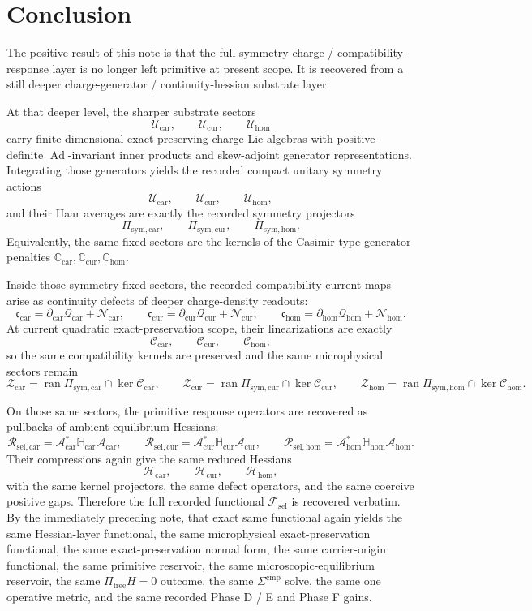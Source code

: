 \documentclass[11pt]{article}
\newcommand{\StemFunctional}{\mathscr F_{\mathrm{sel}}}
\newcommand{\UltraTensorClass}{\mathscr Z_{\mathrm{car}}}
\newcommand{\UltraRelabelClass}{\mathscr Z_{\mathrm{cur}}}
\newcommand{\UltraFreeClass}{\mathscr Z_{\mathrm{hom}}}
\newcommand{\RootTensorClass}{\mathscr U_{\mathrm{car}}}
\newcommand{\RootRelabelClass}{\mathscr U_{\mathrm{cur}}}
\newcommand{\RootFreeClass}{\mathscr U_{\mathrm{hom}}}
\newcommand{\TensorSymProj}{\Pi_{\mathrm{sym,car}}}
\newcommand{\CurSymProj}{\Pi_{\mathrm{sym,cur}}}
\newcommand{\HomSymProj}{\Pi_{\mathrm{sym,hom}}}
\newcommand{\TensorCompat}{\mathcal C_{\mathrm{car}}}
\newcommand{\CurCompat}{\mathcal C_{\mathrm{cur}}}
\newcommand{\HomCompat}{\mathcal C_{\mathrm{hom}}}
\newcommand{\TensorHess}{\mathcal H_{\mathrm{car}}}
\newcommand{\CurHess}{\mathcal H_{\mathrm{cur}}}
\newcommand{\HomHess}{\mathcal H_{\mathrm{hom}}}
\newcommand{\TensorSymAct}{\mathscr U_{\mathrm{car}}}
\newcommand{\CurSymAct}{\mathscr U_{\mathrm{cur}}}
\newcommand{\HomSymAct}{\mathscr U_{\mathrm{hom}}}
\newcommand{\TensorCurrent}{\mathfrak c_{\mathrm{car}}}
\newcommand{\CurCurrent}{\mathfrak c_{\mathrm{cur}}}
\newcommand{\HomCurrent}{\mathfrak c_{\mathrm{hom}}}
\newcommand{\TensorResp}{\mathcal R_{\mathrm{sel,car}}}
\newcommand{\CurResp}{\mathcal R_{\mathrm{sel,cur}}}
\newcommand{\HomResp}{\mathcal R_{\mathrm{sel,hom}}}
\newcommand{\TensorCasimir}{\mathbb C_{\mathrm{car}}}
\newcommand{\CurCasimir}{\mathbb C_{\mathrm{cur}}}
\newcommand{\HomCasimir}{\mathbb C_{\mathrm{hom}}}
\newcommand{\TensorDensity}{\mathcal Q_{\mathrm{car}}}
\newcommand{\CurDensity}{\mathcal Q_{\mathrm{cur}}}
\newcommand{\HomDensity}{\mathcal Q_{\mathrm{hom}}}
\newcommand{\TensorCont}{\partial_{\mathrm{car}}}
\newcommand{\CurCont}{\partial_{\mathrm{cur}}}
\newcommand{\HomCont}{\partial_{\mathrm{hom}}}
\newcommand{\TensorRemainder}{\mathcal N_{\mathrm{car}}}
\newcommand{\CurRemainder}{\mathcal N_{\mathrm{cur}}}
\newcommand{\HomRemainder}{\mathcal N_{\mathrm{hom}}}
\newcommand{\TensorEqRead}{\mathcal A_{\mathrm{car}}}
\newcommand{\CurEqRead}{\mathcal A_{\mathrm{cur}}}
\newcommand{\HomEqRead}{\mathcal A_{\mathrm{hom}}}
\newcommand{\TensorAmbientHess}{\mathbb H_{\mathrm{car}}}
\newcommand{\CurAmbientHess}{\mathbb H_{\mathrm{cur}}}
\newcommand{\HomAmbientHess}{\mathbb H_{\mathrm{hom}}}
\begin{document}
\section{Conclusion}

The positive result of this note is that the full symmetry-charge / compatibility-response layer is no longer left primitive at present scope. It is recovered from a still deeper charge-generator / continuity-hessian substrate layer.

At that deeper level, the sharper substrate sectors
\[
\RootTensorClass,\qquad
\RootRelabelClass,\qquad
\RootFreeClass
\]
carry finite-dimensional exact-preserving charge Lie algebras with positive-definite \(\operatorname{Ad}\)-invariant inner products and skew-adjoint generator representations. Integrating those generators yields the recorded compact unitary symmetry actions
\[
\TensorSymAct,\qquad
\CurSymAct,\qquad
\HomSymAct,
\]
and their Haar averages are exactly the recorded symmetry projectors
\[
\TensorSymProj,\qquad
\CurSymProj,\qquad
\HomSymProj.
\]
Equivalently, the same fixed sectors are the kernels of the Casimir-type generator penalties \(\TensorCasimir,\CurCasimir,\HomCasimir\).

Inside those symmetry-fixed sectors, the recorded compatibility-current maps arise as continuity defects of deeper charge-density readouts:
\[
\TensorCurrent=\TensorCont\TensorDensity+\TensorRemainder,\qquad
\CurCurrent=\CurCont\CurDensity+\CurRemainder,\qquad
\HomCurrent=\HomCont\HomDensity+\HomRemainder.
\]
At current quadratic exact-preservation scope, their linearizations are exactly
\[
\TensorCompat,\qquad
\CurCompat,\qquad
\HomCompat,
\]
so the same compatibility kernels are preserved and the same microphysical sectors remain
\[
\UltraTensorClass=\operatorname{ran}\TensorSymProj\cap\ker\TensorCompat,\qquad
\UltraRelabelClass=\operatorname{ran}\CurSymProj\cap\ker\CurCompat,\qquad
\UltraFreeClass=\operatorname{ran}\HomSymProj\cap\ker\HomCompat.
\]

On those same sectors, the primitive response operators are recovered as pullbacks of ambient equilibrium Hessians:
\[
\TensorResp=\TensorEqRead^*\TensorAmbientHess\TensorEqRead,\qquad
\CurResp=\CurEqRead^*\CurAmbientHess\CurEqRead,\qquad
\HomResp=\HomEqRead^*\HomAmbientHess\HomEqRead.
\]
Their compressions again give the same reduced Hessians
\[
\TensorHess,\qquad
\CurHess,\qquad
\HomHess,
\]
with the same kernel projectors, the same defect operators, and the same coercive positive gaps. Therefore the full recorded functional \(\StemFunctional\) is recovered verbatim. By the immediately preceding note, that exact same functional again yields the same Hessian-layer functional, the same microphysical exact-preservation functional, the same exact-preservation normal form, the same carrier-origin functional, the same primitive reservoir, the same microscopic-equilibrium reservoir, the same \(\Pi_{\mathrm{free}}H=0\) outcome, the same \(\Sigma^{\mathrm{cmp}}\) solve, the same one operative metric, and the same recorded Phase D / E and Phase F gains.
\end{document}
